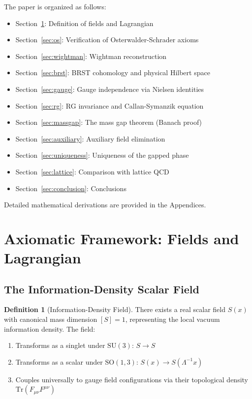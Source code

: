 \documentclass[11pt,a4paper]{article}
\renewcommand{\Tr}{\mathrm{Tr}}
\theoremstyle{plain}
\theoremstyle{definition}
\newtheorem{definition}[theorem]{Definition}
\begin{document}
The paper is organized as follows:
\begin{itemize}
\item Section~\ref{sec:fields}: Definition of fields and Lagrangian
\item Section~\ref{sec:os}: Verification of Osterwalder-Schrader axioms
\item Section~\ref{sec:wightman}: Wightman reconstruction
\item Section~\ref{sec:brst}: BRST cohomology and physical Hilbert space
\item Section~\ref{sec:gauge}: Gauge independence via Nielsen identities
\item Section~\ref{sec:rg}: RG invariance and Callan-Symanzik equation
\item Section~\ref{sec:massgap}: The mass gap theorem (Banach proof)
\item Section~\ref{sec:auxiliary}: Auxiliary field elimination
\item Section~\ref{sec:uniqueness}: Uniqueness of the gapped phase
\item Section~\ref{sec:lattice}: Comparison with lattice QCD
\item Section~\ref{sec:conclusion}: Conclusions
\end{itemize}

Detailed mathematical derivations are provided in the Appendices.

\clearpage

\section{Axiomatic Framework: Fields and Lagrangian}
\label{sec:fields}

\subsection{The Information-Density Scalar Field}

\begin{definition}[Information-Density Field]
\label{def:scalar_field}
There exists a real scalar field $S(x)$ with canonical mass dimension $[S] = 1$, representing the local vacuum information density. The field:
\begin{enumerate}[label=(\alph*)]
\item Transforms as a singlet under $\mathrm{SU}(3)$: $S \to S$
\item Transforms as a scalar under $\mathrm{SO}(1,3)$: $S(x) \to S(\Lambda^{-1}x)$
\item Couples universally to gauge field configurations via their topological density $\Tr(F_{\mu\nu}F^{\mu\nu})$
\end{enumerate}
\end{definition}
\end{document}
